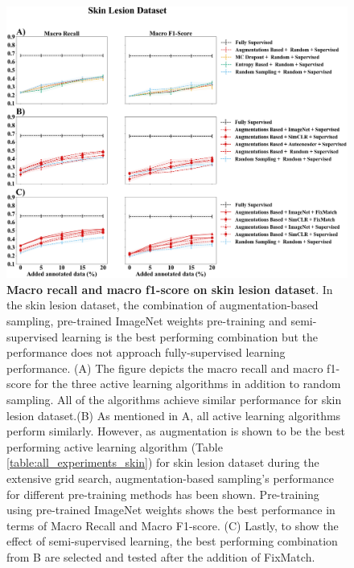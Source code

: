 \begin{figure}[htbp]
\centering
\captionsetup{format=plain}
\includegraphics[width=\textwidth]{figures/fig_2_skin_recall_f1.png}
\caption[Macro recall and macro f1-score on skin lesion dataset]{\textbf{Macro recall and macro f1-score on skin lesion dataset}. In the skin lesion dataset, the combination of augmentation-based sampling, pre-trained ImageNet weights pre-training and semi-supervised learning is the best performing combination but the performance does not approach fully-supervised learning performance. (A) The figure depicts the macro recall and macro f1-score for the three active learning algorithms in addition to random sampling. All of the algorithms achieve similar performance for skin lesion dataset.(B) As mentioned in A, all active learning algorithms perform similarly. However, as augmentation is shown to be the best performing active learning algorithm (Table \ref{table:all_experiments_skin}) for skin lesion dataset during the extensive grid search, augmentation-based sampling's  performance for different pre-training methods has been shown. Pre-training using pre-trained ImageNet weights shows the best performance in terms of Macro Recall and Macro F1-score. (C) Lastly, to show the effect of semi-supervised learning, the best performing combination from B are selected and tested after the addition of FixMatch.}
\label{fig:fig_2_skin_recall_f1}
\end{figure}

